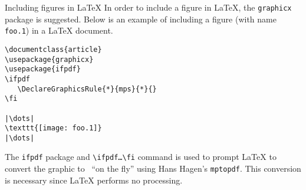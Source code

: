 \begin{section}{Including \MP{} figures in \LaTeX}
In order to include a \MP{} figure in \LaTeX{}, the \texttt{graphicx} package is suggested.  Below is an example of including a \MP{} figure (with name \texttt{foo.1}) in a \LaTeX{} document.
\begin{lstlisting}[xleftmargin=17bp]
\documentclass{article}
\usepackage{graphicx}
\usepackage{ifpdf}
\ifpdf
   \DeclareGraphicsRule{*}{mps}{*}{}
\fi

|\dots|
\texttt{[image: foo.1]}
|\dots|

\end{lstlisting}
The \texttt{ifpdf} package and \verb|\ifpdf|\texttt{\dots}\verb|\fi| command is used to prompt \PDF\LaTeX{} to convert the \MP{} graphic to \PDF\ ``on the fly'' using Hans Hagen's \texttt{mptopdf}.  This conversion is necessary since \PDF\LaTeX{} performs no \PS{} processing.
\end{section}
